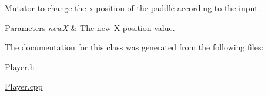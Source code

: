 Mutator to change the x position of the paddle according to the input. 


\begin{DoxyParams}{Parameters}
{\em new\+X} & The new X position value. \\
\hline
\end{DoxyParams}


The documentation for this class was generated from the following files\+:\begin{DoxyCompactItemize}
\item 
\hyperlink{Player_8h}{Player.\+h}\item 
\hyperlink{Player_8cpp}{Player.\+cpp}\end{DoxyCompactItemize}
